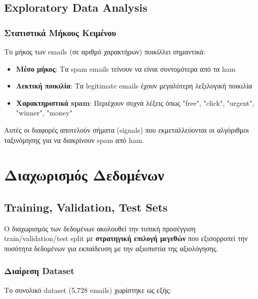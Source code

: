 \documentclass[12pt,a4paper,twoside]{book}
\begin{document}
\subsection{Exploratory Data Analysis}

\subsubsection*{Στατιστικά Μήκους Κειμένου}

Το μήκος των emails (σε αριθμό χαρακτήρων) ποικίλλει σημαντικά:

\begin{itemize}
    \item \textbf{Μέσο μήκος}: Τα spam emails τείνουν να είναι συντομότερα από τα ham
    \item \textbf{Λεκτική ποικιλία}: Τα legitimate emails έχουν μεγαλύτερη λεξιλογική ποικιλία
    \item \textbf{Χαρακτηριστικά spam}: Περιέχουν συχνά λέξεις όπως "free", "click", "urgent", "winner", "money"
\end{itemize}

Αυτές οι διαφορές αποτελούν σήματα (signals) που εκμεταλλεύονται οι αλγόριθμοι ταξινόμησης για να διακρίνουν spam από ham.

\section{Διαχωρισμός Δεδομένων}

\subsection{Training, Validation, Test Sets}

Ο διαχωρισμός των δεδομένων ακολουθεί την τυπική προσέγγιση train/validation/test split με \textbf{στρατηγική επιλογή μεγεθών} που εξισορροπεί την ποσότητα δεδομένων για εκπαίδευση με την αξιοπιστία της αξιολόγησης.

\subsubsection*{Διαίρεση Dataset}

Το συνολικό dataset (5,728 emails) χωρίστηκε ως εξής:
\end{document}
